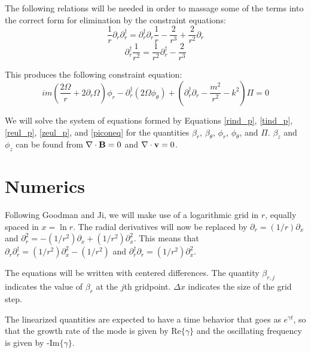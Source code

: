 \documentclass[letterpaper]{article}
\begin{document}
The following relations will be needed in order to massage some of the terms into the correct form for elimination by the constraint equations:
\begin{equation}
\frac{1}{r}\partial_r \partial_r^\dagger = \partial_r^\dagger \partial_r \frac{1}{r} - \frac{2}{r^3} + \frac{2}{r^2}\partial_r
\end{equation}
\begin{equation}
\partial_r^\dagger \frac{1}{r^2} = \frac{1}{r^2} \partial_r^\dagger - \frac{2}{r^3}
\end{equation}

This produces the following constraint equation:
\begin{equation}\label{piconeq}
im\left(\frac{2\Omega}{r}+2\partial_r \Omega\right)\phi_r - \partial_r^\dagger\left(2\Omega\phi_\theta\right)+\left(\partial_r^\dagger \partial_r - \frac{m^2}{r^2}-k^2\right)\Pi = 0
\end{equation}

We will solve the system of equations formed by Equations \ref{rind_p}, \ref{tind_p}, \ref{reul_p}, \ref{zeul_p}, and \ref{piconeq} for the quantities $\beta_r$, $\beta_\theta$, $\phi_r$, $\phi_\theta$, and $\Pi$.  $\beta_z$ and $\phi_z$ can be found from $\nabla\cdot{\bf B}=0$ and $\nabla\cdot{\bf v}=0$.
\section{Numerics}

Following Goodman and Ji, we will make use of a logarithmic grid in $r$, equally spaced in $x=\ln{r}$.  The radial derivatives will now be replaced by $\partial_r = (1/r)\partial_x$ and $\partial_r^2 = -(1/r^2)\partial_x + (1/r^2)\partial_x^2$.  This means that $\partial_r \partial_r^\dagger = (1/r^2)\partial_x^2 - (1/r^2)$ and $\partial_r^\dagger \partial_r = (1/r^2)\partial_x^2$.

The equations will be written with centered differences.  The quantity $\beta_{r,j}$ indicates the value of $\beta_r$ at the $j$th gridpoint. $\Delta x$ indicates the size of the grid step.

The linearized quantities are expected to have a time behavior that goes as $e^{\gamma t}$, so that the growth rate of the mode is given by $\mathrm{Re}\{\gamma\}$ and the oscillating frequency is given by -$\mathrm{Im}\{\gamma\}$.
\end{document}
